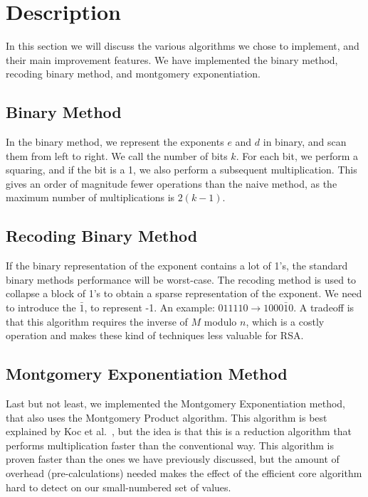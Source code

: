 \documentclass[twocolumn]{IEEEtran}
\begin{document}
\section{Description}
In this section we will discuss the various algorithms we chose to implement, and their main improvement features. We have implemented the binary method, recoding binary method, and montgomery exponentiation.

\subsection*{Binary Method}
In the binary method, we represent the exponents $e$ and $d$ in binary, and scan them from left to right. We call the number of bits $k$. For each bit, we perform a squaring, and if the bit is a 1, we also perform a subsequent multiplication. This gives an order of magnitude fewer operations than the naive method, as the maximum number of multiplications is $2(k-1)$.

\subsection*{Recoding Binary Method}
If the binary representation of the exponent contains a lot of 1’s, the standard binary methods performance will be worst-case. The recoding method is used to collapse a block of 1’s to obtain a sparse representation of the exponent. We need to introduce the $\bar{1}$, to represent -1. An example: $011110 \rightarrow 1000\bar{1}0$. A tradeoff is that this algorithm requires the inverse of $M$ modulo $n$, which is a costly operation and makes these kind of techniques less valuable for RSA.

\subsection*{Montgomery Exponentiation Method}
Last but not least, we implemented the Montgomery Exponentiation method, that also uses the Montgomery Product algorithm. This algorithm is best explained by Koc et al.~\cite{koc}, but the idea is that this is a reduction algorithm that performs multiplication faster than the conventional way. This algorithm is proven faster than the ones we have previously discussed, but the amount of overhead (pre-calculations) needed makes the effect of the efficient core algorithm hard to detect on our small-numbered set of values.
\end{document}
